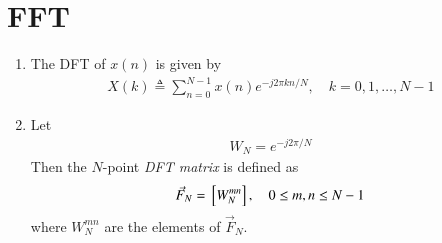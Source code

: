 \documentclass[journal,12pt,twocolumn]{IEEEtran}
\renewcommand\thesection{\arabic{section}}
\begin{document}
\section{FFT}
\begin{enumerate}[label=\arabic*.,ref=\thesection.\theenumi]
    \item The DFT of $x(n)$ is given by
    \begin{align}
        X(k) \triangleq \sum_{n=0}^{N-1} x(n) e^{-j 2 \pi k n / N}, \quad k=0,1, \ldots, N-1
    \end{align}
\item Let 
	\begin{align}
W_{N} = e^{-j2\pi/N} 
	\end{align}
		Then the $N$-point {\em DFT matrix} is defined as 
	\begin{align}
		\vec{F}_{N} = {}\left[W_{N}^{mn}\right], \quad 0 \le m,n \le N-1 
	\end{align}
	where $W_{N}^{mn}$ are the elements of $\vec{F}_{N}$.


\end{enumerate}
\end{document}
